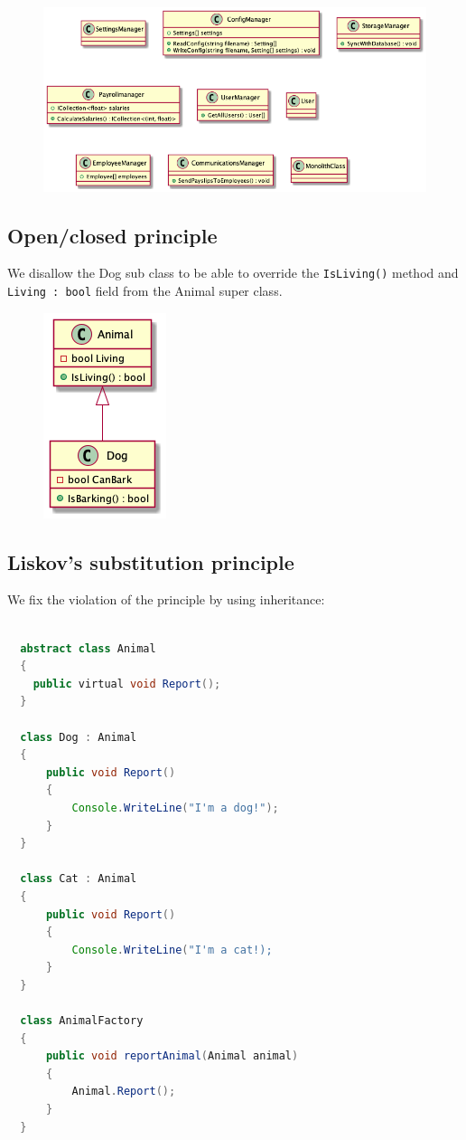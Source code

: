 \documentclass[12pt,letterpaper]{article}
\begin{document}
\begin{figure}[h]
  \centering
  \includegraphics[scale=0.5]{../out/Documents/plantuml/exercise5_single_responsibility/exercise5_single_responsibility.png}
\end{figure}

\subsection*{Open/closed principle}

We disallow the Dog sub class to be able to override the \texttt{IsLiving()} method and \texttt{Living : bool} field from the Animal super class.

\begin{figure}[h]
  \centering
  \includegraphics[scale=0.65]{../out/Documents/plantuml/exercise5_open_closed/exercise5_open_closed.png}
\end{figure}

\pagebreak
\subsection*{Liskov's substitution principle}

We fix the violation of the principle by using inheritance:

\begin{lstlisting}[language=Java]

  abstract class Animal
  {
    public virtual void Report();
  }

  class Dog : Animal
  {
      public void Report()
      {
          Console.WriteLine("I'm a dog!");
      }
  }
  
  class Cat : Animal
  {
      public void Report()
      {
          Console.WriteLine("I'm a cat!);
      }
  }
  
  class AnimalFactory
  {
      public void reportAnimal(Animal animal)
      {
          Animal.Report();
      }
  }
  \end{lstlisting}
\end{document}
